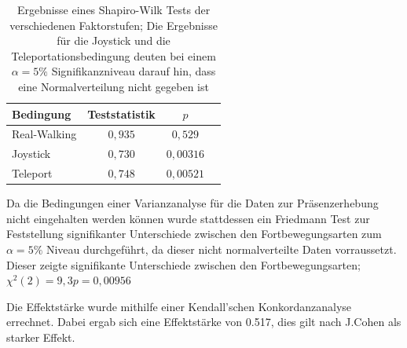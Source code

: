                     \begin{table}[!h]
                        \renewcommand\arraystretch{1.2}
                        \centering
                        \begin{tabular}{lccc} \toprule
                            Bedingung    & Teststatistik    & $p$   \\ \midrule
                            Real-Walking & $0,935$            & $0,529$ \\
                            Joystick     & $0,730$            & $0,00316$ \\
                            Teleport     & $0,748$            & $0,00521$ \\ \bottomrule
                        \end{tabular}
                        \caption{Ergebnisse eines Shapiro-Wilk Tests der verschiedenen Faktorstufen; Die Ergebnisse für die Joystick und die Teleportationsbedingung deuten bei einem $\alpha = 5\%$ Signifikanzniveau darauf hin, dass eine Normalverteilung nicht gegeben ist}\label{table:presence_shapiro}
                    \end{table}

                    Da die Bedingungen einer Varianzanalyse für die Daten zur Präsenzerhebung nicht eingehalten werden können wurde stattdessen ein Friedmann Test zur Feststellung signifikanter Unterschiede zwischen den Fortbewegungsarten zum $\alpha = 5\%$ Niveau durchgeführt, da dieser nicht normalverteilte Daten vorraussetzt.
                    Dieser zeigte signifikante Unterschiede zwischen den Fortbewegungsarten; $\chi^2(2) = 9,3  p = 0,00956$

                    Die Effektstärke wurde mithilfe einer  Kendall’schen Konkordanzanalyse errechnet. Dabei ergab sich eine Effektstärke von 0.517, dies gilt nach J.Cohen %
                    als starker Effekt.


